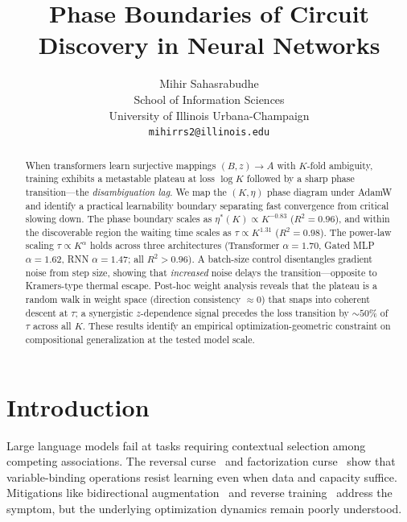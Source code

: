 \documentclass{article}
\title{Phase Boundaries of Circuit Discovery in Neural Networks}
\author{
  Mihir Sahasrabudhe \\
  School of Information Sciences \\
  University of Illinois Urbana-Champaign \\
  \texttt{mihirrs2@illinois.edu}
}
\begin{document}
\maketitle

\begin{abstract}
When transformers learn surjective mappings $(B, z) \to A$ with $K$-fold ambiguity, training exhibits a metastable plateau at loss $\log K$ followed by a sharp phase transition---the \emph{disambiguation lag}.
We map the $(K, \eta)$ phase diagram under AdamW and identify a practical learnability boundary separating fast convergence from critical slowing down.
The phase boundary scales as $\eta^*(K) \propto K^{-0.83}$ ($R^2 = 0.96$), and within the discoverable region the waiting time scales as $\tau \propto K^{1.31}$ ($R^2 = 0.98$).
The power-law scaling $\tau \propto K^\alpha$ holds across three architectures (Transformer $\alpha{=}1.70$, Gated MLP $\alpha{=}1.62$, RNN $\alpha{=}1.47$; all $R^2 {>} 0.96$).
A batch-size control disentangles gradient noise from step size, showing that \emph{increased} noise delays the transition---opposite to Kramers-type thermal escape.
Post-hoc weight analysis reveals that the plateau is a random walk in weight space (direction consistency ${\approx}0$) that snaps into coherent descent at $\tau$; a synergistic $z$-dependence signal precedes the loss transition by ${\sim}50\%$ of $\tau$ across all $K$.
These results identify an empirical optimization-geometric constraint on compositional generalization at the tested model scale.
\end{abstract}


\section{Introduction}

Large language models fail at tasks requiring contextual selection among competing associations.
The reversal curse~\citep{berglund2024reversal} and factorization curse~\citep{kitouni2024factorization} show that variable-binding operations resist learning even when data and capacity suffice.
Mitigations like bidirectional augmentation~\citep{lv2024bico} and reverse training~\citep{golovneva2024reverse} address the symptom, but the underlying optimization dynamics remain poorly understood.
\end{document}
